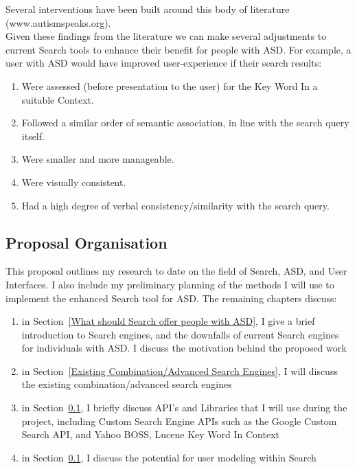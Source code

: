 \documentclass[10pt]{article}
\begin{document}
Several interventions have been built around this body of literature (www.autismspeaks.org).\\
Given these findings from the literature we can make several adjustments to current Search tools to enhance their benefit for people with ASD. For example, a user with ASD would 
have improved user-experience if their search results:\\
\begin{enumerate}
\item Were assessed (before presentation to the user) for the Key Word In a suitable Context.\\
\item Followed a similar order of semantic association, in line with the search query itself. \\
\item Were smaller and more manageable.\\
\item Were visually consistent.\\
\item Had a high degree of verbal consistency/similarity with the search query.\\
\end{enumerate}

\subsection{Proposal Organisation}

This proposal outlines my research to date on the field of Search, ASD, and User Interfaces. I also include my preliminary planning of the methods I will use to implement the enhanced Search tool for ASD. The remaining chapters discuss:
\begin{enumerate}
\item in Section~\ref{What should Search offer people with ASD}, I give a brief introduction to Search engines, and the downfalls of current Search engines for individuals with ASD. I discuss the motivation behind the proposed work
\item in Section~\ref{Existing Combination/Advanced Search Engines}, I will discuss the existing combination/advanced search engines
\item in Section~\ref{}, I briefly discuss API's and Libraries that I will use during the project, including Custom Search Engine APIs such as the Google Custom Search API, and Yahoo BOSS, Lucene Key Word In Context
\item in Section~\ref{}, I discuss the potential for user modeling within Search
\end{enumerate}
\end{document}
